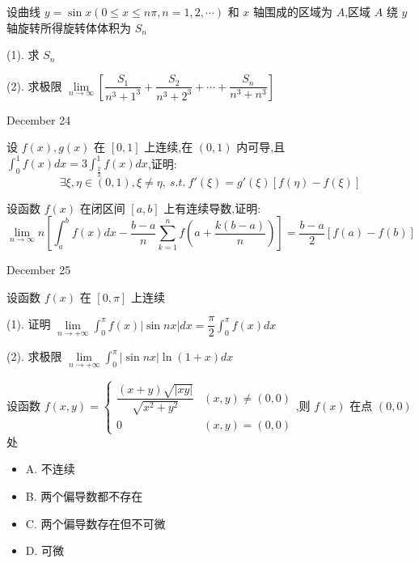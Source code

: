\begin{example}[][Exam: 38.4.4]
	设曲线 $y=\sin x(0\leq x\leq n\pi,n=1,2,\cdots)$ 和 $x$ 轴围成的区域为 $A$,区域 $A$ 绕 $y$ 轴旋转所得旋转体体积为 $S_{n}$

(1). 求 $S_{n}$

(2). 求极限 $\lim\limits_{n\to\infty}[\dfrac{S_{1}}{n^{3}+1^{3}}+\dfrac{S_{2}}{n^{3}+2^{3}}+\cdots+\dfrac{S_{n}}{n^{3}+n^{3}}]$
\end{example}

\begin{solution}
	
\end{solution}


\textcolor{purplea}{December 24}

\begin{example}[][Exam: 38.4.5]
	设 $f(x),g(x)$ 在 $[0,1]$ 上连续,在 $(0,1)$ 内可导,且 $\displaystyle{\int_{0}^{1}f(x)dx=3\int_{\frac{2}{3}}^{1}f(x)dx}$,证明:
	$$\exists \xi,\eta\in(0,1),\xi\neq \eta,\ s.t.\ f'(\xi)=g'(\xi)[f(\eta)-f(\xi)]$$
\end{example}
\begin{solution}
	
\end{solution}

\begin{example}[][Exam: 38.4.6]
	设函数 $f(x)$ 在闭区间 $[a,b]$ 上有连续导数,证明:
$$\lim\limits_{n\to\infty}n[\int_{a}^{b}f(x)dx-\dfrac{b-a}{n}\sum\limits_{k=1}^{n}f(a+\dfrac{k(b-a)}{n})]=\dfrac{b-a}{2}[f(a)-f(b)]$$
\end{example}

\begin{solution}
	
\end{solution}


\textcolor{purplea}{December 25}

\begin{example}[][Exam: 38.4.7]
	设函数 $f(x)$ 在 $[0,\pi]$ 上连续

(1). 证明 $\displaystyle{\lim\limits_{n\to +\infty}\int_{0}^{\pi}f(x)|\sin nx|dx=\dfrac{\pi}{2}\int_{0}^{\pi}f(x)dx}$

(2). 求极限 $\displaystyle{\lim\limits_{n\to +\infty}\int_{0}^{\pi}|\sin nx|\ln(1+x)dx}$ 
\end{example}
\begin{solution}
	
\end{solution}

\begin{example}[][Exam: 38.4.8]
	设函数 $f(x,y)=
\begin{cases}
	\dfrac{(x+y)\sqrt{|xy|}}{\sqrt{x^{2}+y^{2}}} & (x,y)\neq (0,0)\\
	0 & (x,y)=(0,0)
\end{cases}$,则 $f(x)$ 在点 $(0,0)$处
\begin{itemize}
	\item A. 不连续
	\item B. 两个偏导数都不存在
	\item C. 两个偏导数存在但不可微
	\item D. 可微
\end{itemize} 
\end{example}

